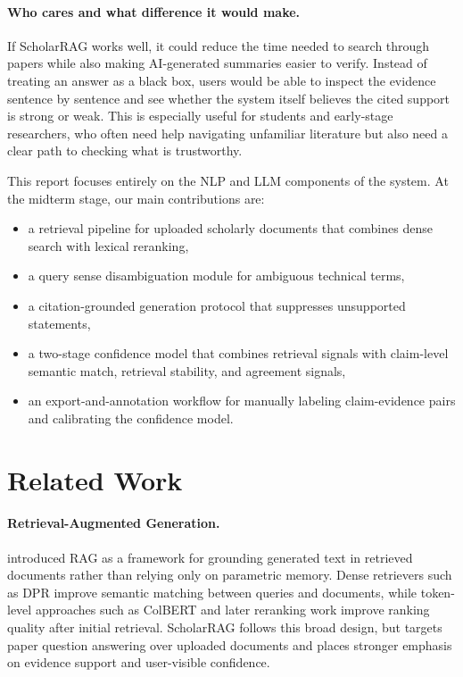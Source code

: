 \documentclass[10pt]{article}
\begin{document}
\paragraph{Who cares and what difference it would make.}
If ScholarRAG works well, it could reduce the time needed to search
through papers while also making AI-generated summaries easier to
verify. Instead of treating an answer as a black box, users would be
able to inspect the evidence sentence by sentence and see whether the
system itself believes the cited support is strong or weak. This is
especially useful for students and early-stage researchers, who often
need help navigating unfamiliar literature but also need a clear path
to checking what is trustworthy.

This report focuses entirely on the NLP and LLM components of the
system. At the midterm stage, our main contributions are:
\begin{itemize}
    \item a retrieval pipeline for uploaded scholarly documents that
          combines dense search with lexical reranking,
    \item a query sense disambiguation module for ambiguous technical
          terms,
    \item a citation-grounded generation protocol that suppresses
          unsupported statements,
    \item a two-stage confidence model that combines retrieval signals
          with claim-level semantic match, retrieval stability, and
          agreement signals,
    \item an export-and-annotation workflow for manually labeling
          claim-evidence pairs and calibrating the confidence model.
\end{itemize}

\section{Related Work}

\paragraph{Retrieval-Augmented Generation.}
\citet{lewis2020rag} introduced RAG as a framework for grounding
generated text in retrieved documents rather than relying only on
parametric memory. Dense retrievers such as DPR
\citep{karpukhin2020dpr} improve semantic matching between queries and
documents, while token-level approaches such as ColBERT
\citep{khattab2020colbert} and later reranking work
\citep{izacard2021leveraging,gao2023rag} improve ranking quality after
initial retrieval. ScholarRAG follows this broad design, but targets
paper question answering over uploaded documents and places stronger
emphasis on evidence support and user-visible confidence.
\end{document}

